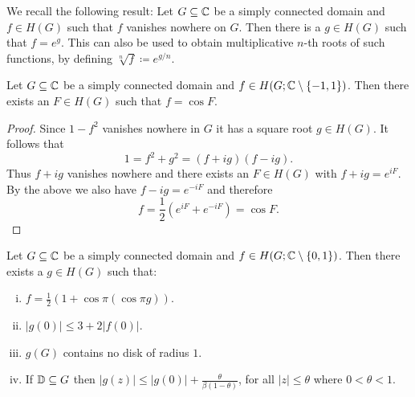 We recall the following result: Let $G \subseteq \mathbb{C}$ be a simply connected domain and $f \in H(G)$ such that $f$ vanishes nowhere on $G$. Then there is a $g \in H(G)$ such that $f = e^g$. This can also be used to obtain multiplicative $n$-th roots of such functions, by defining $\sqrt[n]{f} \coloneqq e^{g/n}$.

\begin{lemma} \label{lem:schottky-2}
    Let $G \subseteq \mathbb{C}$ be a simply connected domain and $f \in H(G; \mathbb{C} \setminus \{ -1, 1 \})$. Then there exists an $F \in H(G)$ such that $f = \cos F$.
\end{lemma}

\begin{proof}
    Since $1 - f^2$ vanishes nowhere in $G$ it has a square root $g \in H(G)$. It follows that
    \begin{equation*}
        1 = f^2 + g^2 = (f + ig)(f - ig).
    \end{equation*}
    Thus $f + ig$ vanishes nowhere and there exists an $F \in H(G)$ with $f + ig = e^{iF}$. By the above we also have $f - ig = e^{-iF}$ and therefore
    $$ f = {\textstyle \frac{1}{2}} (e^{iF} + e^{-iF}) = \cos F. $$
\end{proof}

\begin{lemma} \label{lem:schottky-3}
    Let $G \subseteq \mathbb{C}$ be a simply connected domain and $f \in H(G; \mathbb{C} \setminus \{ 0, 1 \})$. Then there exists a $g \in H(G)$ such that:
    \begin{enumerate}[i.]
        \item $f = \frac{1}{2} ( 1 + \cos \pi (\cos \pi g))$.
        \item $\vert g(0) \vert \leq 3 + 2 \vert f(0) \vert$.
        \item $g(G)$ contains no disk of radius $1$.
        \item If $\mathbb{D} \subseteq G$ then $\vert g(z) \vert \leq \vert g(0) \vert + \frac{\theta}{\beta (1 - \theta)}$, for all $\vert z \vert \leq \theta$ where $0 < \theta < 1$.
    \end{enumerate}
\end{lemma}

